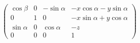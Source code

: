 


$\left( \begin{array}{cccc} \cos\beta & 0 & -\sin\alpha & -x\cos\alpha - y\sin\alpha\\ 0 & 1 & 0 & -x\sin\alpha + y\cos\alpha\\ \sin\alpha & 0 & \cos\alpha & -z\\ 0 & 0 & 0 & 1\end{array} \right)$


